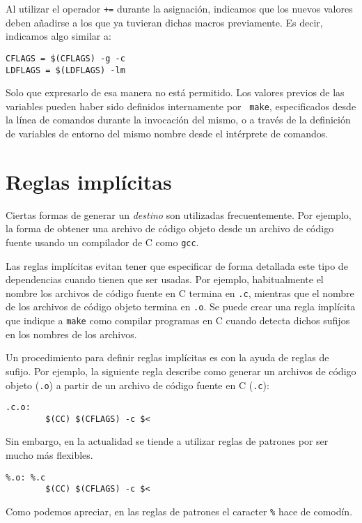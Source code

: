 Al utilizar el operador {\tt +=} durante la asignación, indicamos que
los nuevos valores deben añadirse a los que ya tuvieran dichas macros
previamente. Es decir, indicamos algo similar a:

\begin{verbatim}
CFLAGS = $(CFLAGS) -g -c
LDFLAGS = $(LDFLAGS) -lm
\end{verbatim}

Solo que expresarlo de esa manera no está permitido. Los valores previos
de las variables pueden haber sido definidos internamente por {\tt
make}, especificados desde la línea de comandos durante la invocación
del mismo, o a través de la definición de variables de entorno del mismo
nombre desde el intérprete de comandos.

\section{Reglas implícitas}

Ciertas formas de generar un {\em destino} son utilizadas
frecuentemente. Por ejemplo, la forma de obtener una archivo de código
objeto desde un archivo de código fuente usando un compilador de C como
{\tt gcc}.

Las reglas implícitas evitan tener que especificar de forma detallada
este tipo de dependencias cuando tienen que ser usadas. Por ejemplo,
habitualmente el nombre los archivos de código fuente en C termina
en {\tt .c}, mientras que el nombre de los archivos de código objeto
termina en {\tt .o}. Se puede crear una regla implícita que indique a
{\tt make} como compilar programas en C cuando detecta dichos sufijos en
los nombres de los archivos.

Un procedimiento para definir reglas implícitas es con la ayuda de
reglas de sufijo. Por ejemplo, la siguiente regla describe como generar
un archivos de código objeto ({\tt *.o}) a partir de un archivo de
código fuente en C ({\tt *.c}):

\begin{verbatim}
.c.o:
        $(CC) $(CFLAGS) -c $<
\end{verbatim}

Sin embargo, en la actualidad se tiende a utilizar reglas de patrones
por ser mucho más flexibles.

\begin{verbatim}
%.o: %.c
        $(CC) $(CFLAGS) -c $<
\end{verbatim}

Como podemos apreciar, en las reglas de patrones el caracter {\tt \%}
hace de comodín.

